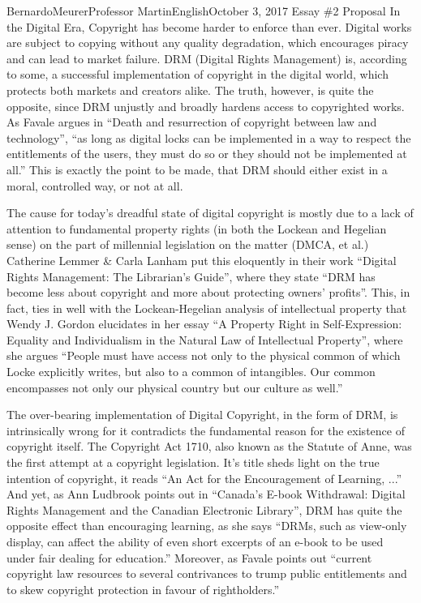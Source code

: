 \documentclass[12pt,letterpaper]{article}
\begin{document}
        \begin{mla}{Bernardo}{Meurer}{Professor Martin}{English}{October 3, 2017}%
            {Essay \#2 Proposal}
        In the Digital Era, Copyright has become harder to enforce than ever. 
        Digital works are subject to copying without any quality degradation, which encourages piracy and can lead to market failure.  DRM (Digital Rights Management) is, according to some, a successful implementation of copyright in the digital world, which protects both markets and creators alike. The truth, however, is quite the opposite, since DRM unjustly and broadly hardens access to copyrighted works. As Favale argues in ``Death and resurrection of copyright between law and technology'', ``as long as digital locks can be implemented in a way to respect the entitlements of the users, they must do so or they should not be implemented at all.'' This is exactly the point to be made, that DRM should either exist in a moral, controlled way, or not at all.
    
        The cause for today's dreadful state of digital copyright is mostly due to a lack of attention to fundamental property rights (in both the Lockean and Hegelian sense) on the part of millennial legislation on the matter (DMCA, et al.)  Catherine Lemmer \& Carla Lanham put this eloquently in their work ``Digital Rights Management: The Librarian's Guide'', where they state ``DRM has become less about copyright and more about protecting owners' profits''. This, in fact, ties in well with the Lockean-Hegelian analysis of intellectual property that Wendy J. Gordon elucidates in her essay ``A Property Right in Self-Expression: Equality and Individualism in the Natural Law of Intellectual Property'', where she argues ``People must have access not only to the physical common of which Locke explicitly writes, but also to a common of intangibles. Our common encompasses not only our physical country but our culture as well.''

        The over-bearing implementation of Digital Copyright, in the form of DRM, is intrinsically wrong for it contradicts the fundamental reason for the existence of copyright itself. The Copyright Act 1710, also known as the Statute of Anne, was the first attempt at a copyright legislation. It's title sheds light on the true intention of copyright,
        it reads ``An Act for the Encouragement of Learning, ...'' And yet, as Ann Ludbrook points out in ``Canada's E-book Withdrawal: Digital Rights Management and the Canadian Electronic Library'', DRM has quite the opposite effect than encouraging learning, as she says ``DRMs, such as view-only display, can affect the ability of even short excerpts of an e-book to be used under fair dealing for education.'' Moreover, as Favale points out ``current copyright law resources to several contrivances to trump public entitlements and to skew copyright protection in favour of rightholders.''


\end{mla}
\end{document}
